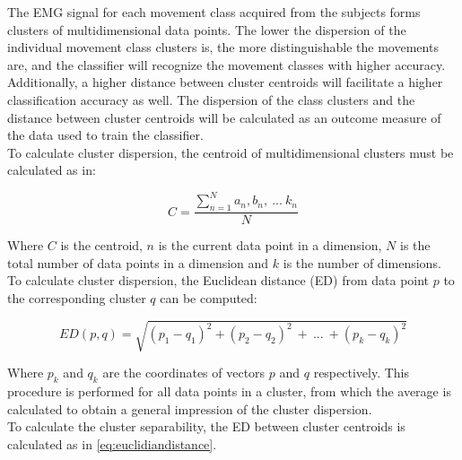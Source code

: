 The EMG signal for each movement class acquired from the subjects forms clusters of multidimensional data points. The lower the dispersion of the individual movement class clusters is, the more distinguishable the movements are, and the classifier will recognize the movement classes with higher accuracy. Additionally, a higher distance between cluster centroids will facilitate a higher classification accuracy as well. The dispersion of the class clusters and the distance between cluster centroids will be calculated as an outcome measure of the data used to train the classifier. \\%
To calculate cluster dispersion, the centroid of multidimensional clusters must be calculated as in:
\vspace{-0.5cm}

 \begin{equation} \label{eq:centroid}
C = \frac{\sum\limits_{n=1}^{N}a_{n},b_{n},~...~k_{n}}{N}
\end{equation}
\vspace{-0.5cm}

Where $C$ is the centroid, $n$ is the current data point in a dimension, $N$ is the total number of data points in a dimension and $k$ is the number of dimensions. To calculate cluster dispersion, the Euclidean distance (ED) from data point $p$ to the corresponding cluster $q$ can be computed: %
\vspace{-0.5cm}

\begin{equation} \label{eq:euclidiandistance}
ED(p,q) = \sqrt{(p_1-q_1)^2 + (p_2-q_2)^2~+~...~+ (p_k-q_k)^2}
\end{equation} 
\vspace{-0.5cm}

Where $p_k$ and $q_k$ are the coordinates of vectors $p$ and $q$ respectively. This procedure is performed for all data points in a cluster, from which the average is calculated to obtain a general impression of the cluster dispersion.\\
To calculate the cluster separability, the ED between cluster centroids is calculated as in \eqref{eq:euclidiandistance}.  

